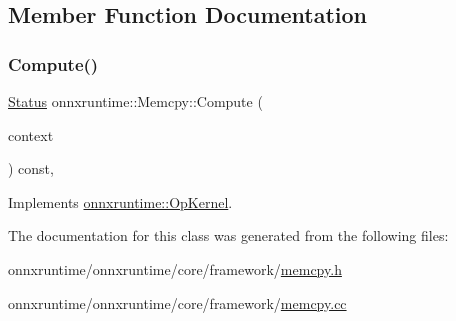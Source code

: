\subsection{Member Function Documentation}
\mbox{\label{classonnxruntime_1_1Memcpy_a853b7bff38cb630dac17f6a19aadcbb6}} 
\subsubsection{\texorpdfstring{Compute()}{Compute()}}
{\footnotesize\ttfamily \mbox{\hyperlink{classonnxruntime_1_1common_1_1Status}{Status}} onnxruntime\+::\+Memcpy\+::\+Compute (\begin{DoxyParamCaption}\item[{\mbox{\hyperlink{classonnxruntime_1_1OpKernelContext}{Op\+Kernel\+Context}} $\ast$}]{context }\end{DoxyParamCaption}) const\hspace{0.3cm}{\ttfamily [override]}, {\ttfamily [virtual]}}



Implements \mbox{\hyperlink{classonnxruntime_1_1OpKernel_a9eca8656a78b1b3ab9d3351a12798650}{onnxruntime\+::\+Op\+Kernel}}.



The documentation for this class was generated from the following files\+:\begin{DoxyCompactItemize}
\item 
onnxruntime/onnxruntime/core/framework/\mbox{\hyperlink{memcpy_8h}{memcpy.\+h}}\item 
onnxruntime/onnxruntime/core/framework/\mbox{\hyperlink{memcpy_8cc}{memcpy.\+cc}}\end{DoxyCompactItemize}
